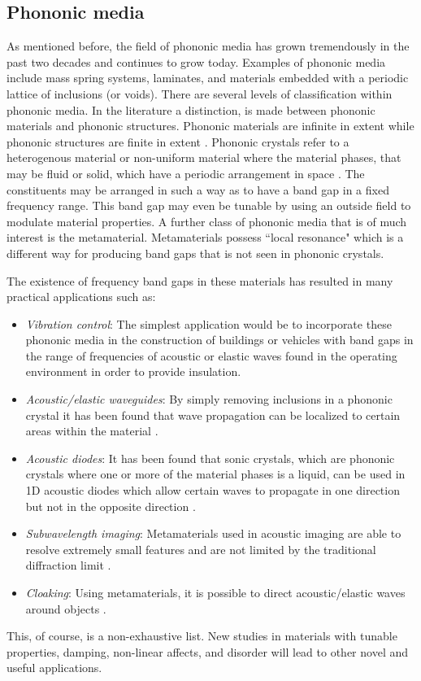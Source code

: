\documentclass{article}
\begin{document}
\subsection{Phononic media}
As mentioned before, the field of phononic media has grown tremendously in the 
past two decades and continues to grow today. Examples of phononic media 
include mass spring systems, laminates, and materials embedded with a periodic 
lattice of inclusions (or voids). There are several levels of classification 
within phononic media. In the literature a distinction, is made between 
phononic materials and phononic structures. Phononic materials are infinite in 
extent while phononic structures are finite in extent \cite{hussein10}. 
Phononic crystals refer to a heterogenous material or non-uniform material 
where the 
material phases, that may be fluid or solid, which have a periodic arrangement 
in 
space \cite{hussein14}. The constituents may be arranged in such a way as to 
have a band gap in a fixed frequency range. This band gap may even be tunable 
by using an outside field to modulate material properties. 
A further class of phononic media that is of much interest 
is the metamaterial. Metamaterials possess ``local resonance" which is a 
different way for producing band gaps that is not seen in phononic crystals. 

The existence of frequency band gaps in these materials has resulted in many 
practical applications such as:
\begin{itemize}
	\item \emph{Vibration control}: The simplest application would be to 
	incorporate these phononic media in the construction of buildings or 
	vehicles with band gaps in the range of frequencies of acoustic or elastic 
	waves found in the operating environment in order to provide insulation.
	\item \emph{Acoustic/elastic waveguides}: By simply removing inclusions in 
	a phononic crystal it has been found that wave propagation can be localized 
	to certain areas within the material \cite{hou12}. 
	\item \emph{Acoustic diodes}: It has been found that sonic 
	crystals, which are phononic crystals where one or more of the material 
	phases is a liquid, can be used in 1D acoustic diodes which allow certain 
	waves to propagate in one direction but not in the opposite direction 
	\cite{zhang10}.
	\item \emph{Subwavelength imaging}: Metamaterials used in acoustic imaging 
	are able to resolve extremely small features and are not limited by the 
	traditional diffraction limit \cite{sukhovich09}.
	\item \emph{Cloaking}: Using metamaterials, it is possible to direct 
	acoustic/elastic waves around objects \cite{norris11}.
\end{itemize}
This, of course, is a non-exhaustive list. New studies in materials with 
tunable properties, damping, non-linear affects, and disorder will lead to 
other novel and useful applications.
\end{document}
